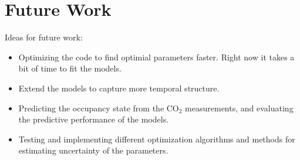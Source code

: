 \section{Future Work}
Ideas for future work: 

\begin{itemize}
    \item Optimizing the code to find optimial parameters faster. Right now it takes a bit of time to fit the models. 
    \item Extend the models to capture more temporal structure. 
    \item Predicting the occupancy state from the $\text{CO}_2$ measurements, and evaluating the predictive performance of the models.
    \item Testing and implementing different optimization algorithms and methods for estimating uncertainty of the parameters.
\end{itemize}
